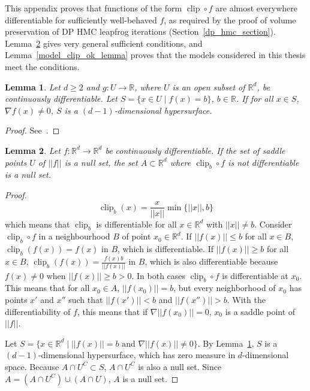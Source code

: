 \documentclass[english,twoside,openright]{HYgraduMLDS}
\newtheorem{lemma}{Lemma}
\newcommand{\R}{\mathbb{R}}
\DeclareMathOperator{\clip}{clip}
\begin{document}
\begin{appendices}
This appendix proves that functions of the form \(\clip\circ f\) are
almost everywhere differentiable for sufficiently well-behaved \(f\),
as required by the proof of volume preservation
of DP HMC leapfrog iterations (Section~\ref{dp_hmc_section}).
Lemma~\ref{clip_is_almost_everywhere_differentiable} gives very general
sufficient conditions, and Lemma~\ref{model_clip_ok_lemma} proves that the
models considered in this thesis meet the conditions.

\begin{lemma}\label{level_set_lemma}
  Let \(d \geq 2\) and \(g\colon U \to \R\), where \(U\) is an open subset of
  \(\R^{d}\), be continuously differentiable. Let \(S = \{x\in U\mid f(x) = b\}\),
  \(b\in \R\).
  If for all \(x\in S\), \(\nabla f(x) \neq 0\), \(S\) is a \((d - 1)\)-dimensional
  hypersurface.
\end{lemma}
\begin{proof}
	See~\cite[Section 9.2]{Tu11}.
\end{proof}

\begin{lemma}\label{clip_is_almost_everywhere_differentiable}
  Let \(f\colon \R^{d}\to \R^{d}\) be continuously differentiable.
  If the set of saddle points \(U\) of \(||f||\) is a null set,
  the set \(A\subset \R^{d}\)
  where \(\clip_{b} \circ f\) is not differentiable is a null set.
\end{lemma}
\begin{proof}
  \[
    \clip_{b}(x) = \frac{x}{||x||}\min\{||x||, b\}
  \]
  which means that \(\clip_{b}\) is differentiable for all \(x\in \R^{d}\) with
  \(||x|| \neq b\). Consider \(\clip_{b}\circ f\) in a neighbourhood \(B\) of
  point \(x_{0}\in \R^{d}\). If \(||f(x)|| \leq b\) for all \(x\in B\),
  \(\clip_{b}(f(x)) = f(x)\) in \(B\), which is differentiable. If \(||f(x)|| \geq b\)
  for all \(x\in B\), \(\clip_{b}(f(x)) = \frac{f(x)b}{||f(x)||}\) in \(B\),
  which is also differentiable because \(f(x) \neq 0\) when
  \(||f(x)|| \geq b > 0\). In both cases \(\clip_{b}\circ f\) is differentiable
  at \(x_{0}\). This means that for all \(x_{0}\in A\), \(||f(x_{0})|| = b\), but
  every neighborhood
  of \(x_{0}\) has points \(x'\) and \(x''\) such that \(||f(x')|| < b\) and
  \(||f(x'')|| > b\). With the differentiability of \(f\), this means that
  if \(\nabla ||f(x_{0})|| = 0\), \(x_{0}\) is a saddle point of \(||f||\).

  Let \(S = \{x\in \R^{d}\mid ||f(x)|| = b \text{ and } \nabla ||f(x)|| \neq 0\}\).
  By Lemma~\ref{level_set_lemma},
  \(S\) is a \((d-1)\)-dimensional hypersurface, which has zero measure
  in \(d\)-dimensional space. Because \(A\cap U^{C} \subset S\), \(A\cap U^{C}\)
  is also a null set. Since \(A = (A\cap U^{C}) \cup (A\cap U)\),
  \(A\) is a null set.


\end{proof}
\end{appendices}
\end{document}
